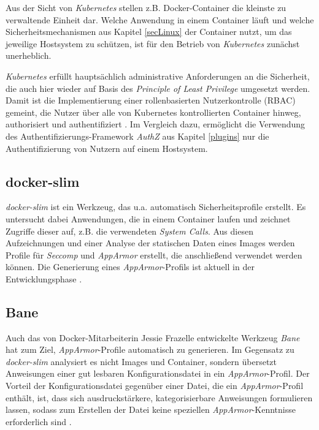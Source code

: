 \documentclass[../main.tex]{subfiles}
\begin{document}
      Aus der Sicht von \emph{Kubernetes} stellen z.B. Docker-Container die kleinste zu verwaltende Einheit dar. Welche Anwendung in einem Container läuft und welche Sicherheitsmechanismen aus Kapitel \ref{secLinux} der Container nutzt, um das jeweilige Hostsystem zu schützen, ist für den Betrieb von \emph{Kubernetes} zunächst unerheblich.

      \emph{Kubernetes} erfüllt hauptsächlich administrative Anforderungen an die Sicherheit, die auch hier wieder auf Basis des \emph{Principle of Least Privilege} umgesetzt werden. Damit ist die Implementierung einer rollenbasierten Nutzerkontrolle (\acrshort{RBAC}) gemeint, die Nutzer über alle von Kubernetes kontrollierten Container hinweg, authorisiert und authentifiziert \cite{githubKubernetesSecurity}. Im Vergleich dazu, ermöglicht die Verwendung des Authentifizierungs-Framework \emph{AuthZ} aus Kapitel \ref{plugins} nur die Authentifizierung von Nutzern auf einem Hostsystem.



    \subsection{docker-slim}
      \emph{docker-slim} ist ein Werkzeug, das u.a. automatisch Sicherheitsprofile erstellt. Es untersucht dabei Anwendungen, die in einem Container laufen und zeichnet Zugriffe dieser auf, z.B. die verwendeten \emph{System Calls}. Aus diesen Aufzeichnungen und einer Analyse der statischen Daten eines Images werden Profile für \emph{Seccomp} und \emph{AppArmor} erstellt, die anschließend verwendet werden können. Die Generierung eines \emph{AppArmor}-Profils ist aktuell in der Entwicklungsphase \cite{githubDockerSlim}.

    \subsection{Bane}
      Auch das von Docker-Mitarbeiterin Jessie Frazelle entwickelte Werkzeug \emph{Bane} hat zum Ziel, \emph{AppArmor}-Profile automatisch zu generieren. Im Gegensatz zu \emph{docker-slim} analysiert es nicht Images und Container, sondern übersetzt Anweisungen einer gut lesbaren Konfigurationsdatei in ein \emph{AppArmor}-Profil. Der Vorteil der Konfigurationsdatei gegenüber einer Datei, die ein \emph{AppArmor}-Profil enthält, ist, dass sich ausdruckstärkere, kategorisierbare Anweisungen formulieren lassen, sodass zum Erstellen der Datei keine speziellen \emph{AppArmor}-Kenntnisse erforderlich sind \cite{githubBane}.
\end{document}
